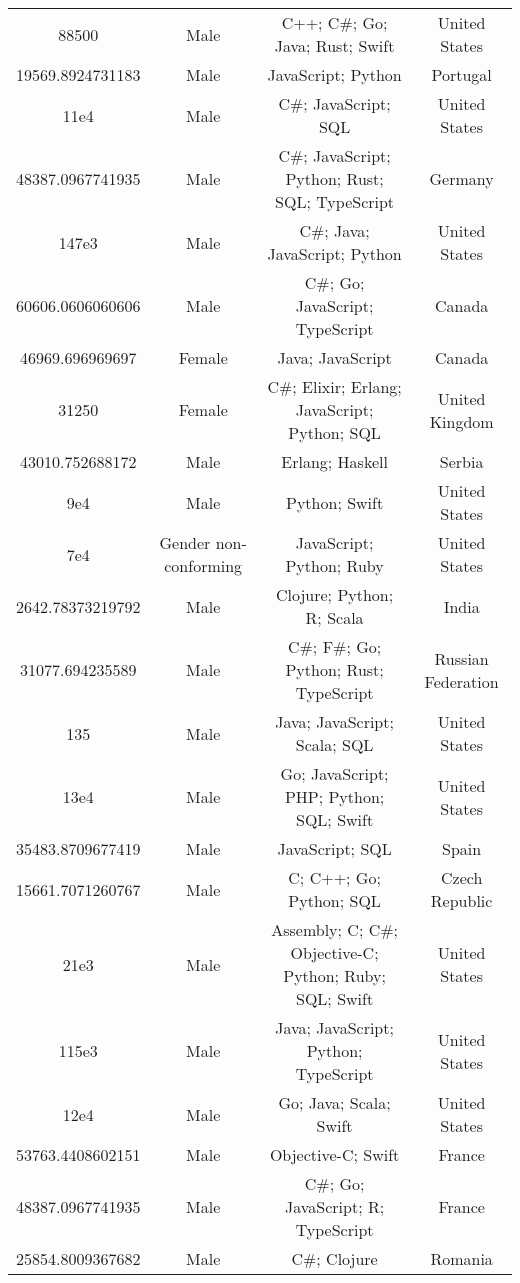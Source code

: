 \begin{center}
\begin{tabular}{ |c|c|c|c| }
88500  &  Male  &  C++; C\#; Go; Java; Rust; Swift  &  United States  \\ 
19569.8924731183  &  Male  &  JavaScript; Python  &  Portugal  \\ 
11e4  &  Male  &  C\#; JavaScript; SQL  &  United States  \\ 
48387.0967741935  &  Male  &  C\#; JavaScript; Python; Rust; SQL; TypeScript  &  Germany  \\ 
147e3  &  Male  &  C\#; Java; JavaScript; Python  &  United States  \\ 
60606.0606060606  &  Male  &  C\#; Go; JavaScript; TypeScript  &  Canada  \\ 
46969.696969697  &  Female  &  Java; JavaScript  &  Canada  \\ 
31250  &  Female  &  C\#; Elixir; Erlang; JavaScript; Python; SQL  &  United Kingdom  \\ 
43010.752688172  &  Male  &  Erlang; Haskell  &  Serbia  \\ 
9e4  &  Male  &  Python; Swift  &  United States  \\ 
7e4  &  Gender non-conforming  &  JavaScript; Python; Ruby  &  United States  \\ 
2642.78373219792  &  Male  &  Clojure; Python; R; Scala  &  India  \\ 
31077.694235589  &  Male  &  C\#; F\#; Go; Python; Rust; TypeScript  &  Russian Federation  \\ 
135  &  Male  &  Java; JavaScript; Scala; SQL  &  United States  \\ 
13e4  &  Male  &  Go; JavaScript; PHP; Python; SQL; Swift  &  United States  \\ 
35483.8709677419  &  Male  &  JavaScript; SQL  &  Spain  \\ 
15661.7071260767  &  Male  &  C; C++; Go; Python; SQL  &  Czech Republic  \\ 
21e3  &  Male  &  Assembly; C; C\#; Objective-C; Python; Ruby; SQL; Swift  &  United States  \\ 
115e3  &  Male  &  Java; JavaScript; Python; TypeScript  &  United States  \\ 
12e4  &  Male  &  Go; Java; Scala; Swift  &  United States  \\ 
53763.4408602151  &  Male  &  Objective-C; Swift  &  France  \\ 
48387.0967741935  &  Male  &  C\#; Go; JavaScript; R; TypeScript  &  France  \\ 
25854.8009367682  &  Male  &  C\#; Clojure  &  Romania  \\ 

\end{tabular}
\end{center}
